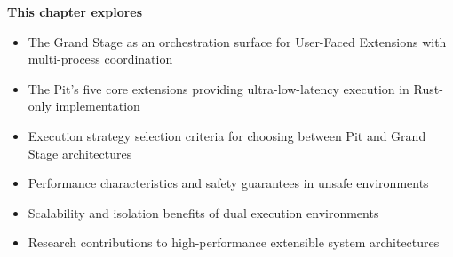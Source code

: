\begin{tcolorbox}[
    enhanced,
    colback=white,
    colframe=brandPrimary!40,
    boxrule=1pt,
    arc=12pt,
    drop shadow={brandPrimary!20},
    left=1.5cm,
    right=1.5cm,
    top=1.2cm,
    bottom=1.2cm,
    before upper={\parindent0pt}
]
\begin{center}
{\Large\textbf{\textcolor{brandPrimary}{This chapter explores}}}
\end{center}

\vspace{0.8cm}

\begin{itemize}[leftmargin=1.2cm, itemsep=0.4cm, label={\textcolor{brandAccent}{$\triangleright$}}]
    \item {\large The Grand Stage as an orchestration surface for User-Faced Extensions with multi-process coordination}
    \item {\large The Pit's five core extensions providing ultra-low-latency execution in Rust-only implementation}
    \item {\large Execution strategy selection criteria for choosing between Pit and Grand Stage architectures}
    \item {\large Performance characteristics and safety guarantees in unsafe environments}
    \item {\large Scalability and isolation benefits of dual execution environments}
    \item {\large Research contributions to high-performance extensible system architectures}
\end{itemize}
\end{tcolorbox}

\clearpage
